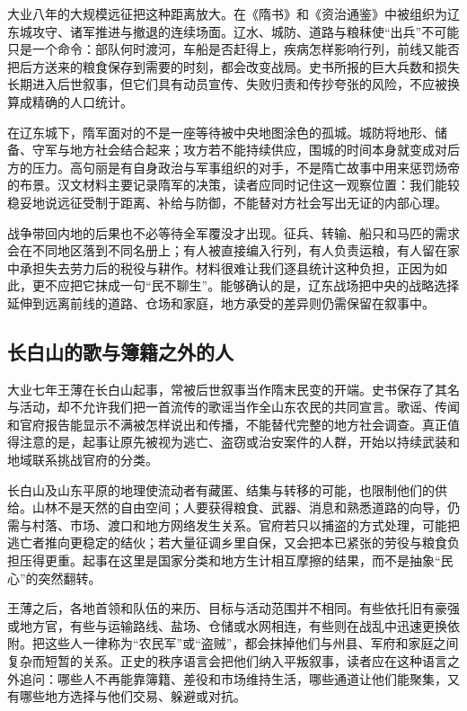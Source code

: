 大业八年的大规模远征把这种距离放大。在《隋书》和《资治通鉴》中被组织为辽东城攻守、诸军推进与撤退的连续场面。辽水、城防、道路与粮秣使“出兵”不可能只是一个命令：部队何时渡河，车船是否赶得上，疾病怎样影响行列，前线又能否把后方送来的粮食保存到需要的时刻，都会改变战局。史书所报的巨大兵数和损失长期进入后世叙事，但它们具有动员宣传、失败归责和传抄夸张的风险，不应被换算成精确的人口统计。

在辽东城下，隋军面对的不是一座等待被中央地图涂色的孤城。城防将地形、储备、守军与地方社会结合起来；攻方若不能持续供应，围城的时间本身就变成对后方的压力。高句丽是有自身政治与军事组织的对手，不是隋亡故事中用来惩罚炀帝的布景。汉文材料主要记录隋军的决策，读者应同时记住这一观察位置：我们能较稳妥地说远征受制于距离、补给与防御，不能替对方社会写出无证的内部心理。

战争带回内地的后果也不必等待全军覆没才出现。征兵、转输、船只和马匹的需求会在不同地区落到不同名册上；有人被直接编入行列，有人负责运粮，有人留在家中承担失去劳力后的税役与耕作。材料很难让我们逐县统计这种负担，正因为如此，更不应把它抹成一句“民不聊生”。能够确认的是，辽东战场把中央的战略选择延伸到远离前线的道路、仓场和家庭，地方承受的差异则仍需保留在叙事中。

\subsection{长白山的歌与簿籍之外的人}
大业七年王薄在长白山起事，常被后世叙事当作隋末民变的开端。史书保存了其名与活动，却不允许我们把一首流传的歌谣当作全山东农民的共同宣言。歌谣、传闻和官府报告能显示不满被怎样说出和传播，不能替代完整的地方社会调查。真正值得注意的是，起事让原先被视为逃亡、盗窃或治安案件的人群，开始以持续武装和地域联系挑战官府的分类。

长白山及山东平原的地理使流动者有藏匿、结集与转移的可能，也限制他们的供给。山林不是天然的自由空间；人要获得粮食、武器、消息和熟悉道路的向导，仍需与村落、市场、渡口和地方网络发生关系。官府若只以捕盗的方式处理，可能把逃亡者推向更稳定的结伙；若大量征调乡里自保，又会把本已紧张的劳役与粮食负担压得更重。起事在这里是国家分类和地方生计相互摩擦的结果，而不是抽象“民心”的突然翻转。

王薄之后，各地首领和队伍的来历、目标与活动范围并不相同。有些依托旧有豪强或地方官，有些与运输路线、盐场、仓储或水网相连，有些则在战乱中迅速更换依附。把这些人一律称为“农民军”或“盗贼”，都会抹掉他们与州县、军府和家庭之间复杂而短暂的关系。正史的秩序语言会把他们纳入平叛叙事，读者应在这种语言之外追问：哪些人不再能靠簿籍、差役和市场维持生活，哪些通道让他们能聚集，又有哪些地方选择与他们交易、躲避或对抗。

